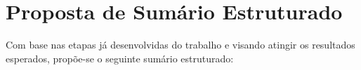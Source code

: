 \section{Proposta de Sumário Estruturado} \label{SumarioEstruturado}

Com base nas etapas já desenvolvidas do trabalho e visando atingir os resultados esperados, propõe-se o seguinte sumário estruturado:

{

\newcommand{\itemi}[1]{\item \hspace{3em}\textbf{#1}}
\newcommand{\itemii}[1]{\item \hspace{2em}\textbf{#1}}
\newcommand{\itemiii}[1]{\item \hspace{1em}{#1}}

}
